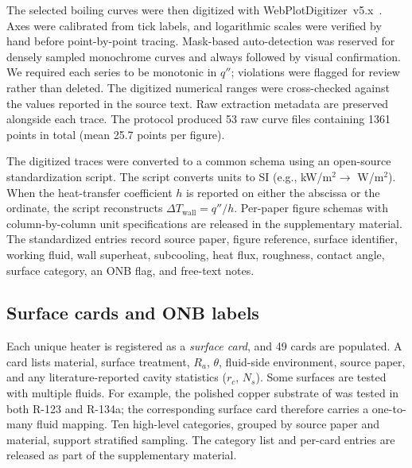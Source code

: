 The selected boiling curves were then digitized with
WebPlotDigitizer~v5.x~\citep{rohatgi_wpd}.
Axes were calibrated from tick labels, and logarithmic scales were
verified by hand before point-by-point tracing. Mask-based
auto-detection was reserved for densely sampled monochrome curves
and always followed by visual confirmation. We required each series
to be monotonic in $q''$; violations were flagged for review rather
than deleted. The digitized numerical ranges were cross-checked
against the values reported in the source text. Raw extraction
metadata are preserved alongside each trace. The protocol produced
\num{53} raw curve files containing \num{1361} points in total
(mean \num{25.7} points per figure).

The digitized traces were converted to a common schema using an
open-source standardization script. The script converts units to SI
(e.g., kW/m$^{2} \to$ W/m$^{2}$). When the heat-transfer
coefficient $h$ is reported on either the abscissa or the ordinate,
the script reconstructs $\Delta T_{\mathrm{wall}} = q''/h$.
Per-paper figure schemas with column-by-column unit specifications
are released in the supplementary material. The standardized
entries record source paper, figure reference, surface identifier,
working fluid, wall superheat, subcooling, heat flux, roughness,
contact angle, surface category, an ONB flag, and free-text notes.

\subsection{Surface cards and ONB labels}\label{subsec:cards}\label{subsec:sfc}\label{subsec:onb_label}

Each unique heater is registered as a \emph{surface card}, and
\num{49} cards are populated. A card lists material, surface
treatment, $R_a$, $\theta$, fluid-side environment, source paper, and
any literature-reported cavity statistics ($r_c$, $N_s$). Some
surfaces are tested with multiple fluids. For example, the polished
copper substrate of \citet{jabardo2009} was tested in both R-123 and
R-134a; the corresponding surface card therefore carries a
one-to-many fluid mapping. Ten high-level categories, grouped by
source paper and material, support stratified sampling. The
category list and per-card entries are released as part of the
supplementary material.

